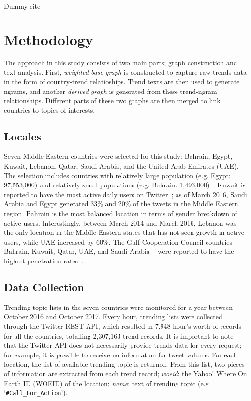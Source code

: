 \documentclass[conference]{IEEEtran}
\begin{document}
Dummy cite~\cite{oatley+crick:snam2015,albishry-et-al:iccci2017,albishry-et-al:ssei2018}

\section{Methodology}\label{method}

The approach in this study consists of two main parts; graph construction
and text analysis. First, {\emph{weighted base graph}} is constructed to 
capture raw trends data in the form of country-trend relatioships. Trend 
texts are then used to generate ngrams, and another {\emph{derived graph}}
is generated from these trend-ngram relationships. Different parts of these 
two graphs are then merged to link countries to topics of interests.

\subsection{Locales}

Seven Middle Eastern countries were selected for this study: Bahrain,
Egypt, Kuwait, Lebanon, Qatar, Saudi Arabia, and the United Arab
Emirates (UAE). The selection includes countries with relatively large
population (e.g. Egypt: 97,553,000) and relatively small populations
(e.g. Bahrain:
1,493,000)~\cite{UnitedNationsDepartmentofEconomicandSocialAffairs2017}.
Kuwait is reported to have the most active daily users on
Twitter~\cite{Salem2017}; as of March 2016, Saudi Arabia and Egypt
generated 33\% and 20\% of the tweets in the Middle Eastern
region. Bahrain is the most balanced location in terms of gender
breakdown of active users. Interestingly, between March 2014 and March
2016, Lebanon was the only location in the Middle Eastern states that
has not seen growth in active users, while UAE increased by 60\%. The
Gulf Cooperation Council countries -- Bahrain, Kuwait, Qatar, UAE, and
Saudi Arabia -- were reported to have the highest penetration
rates~\cite{Salem2017}.

\subsection{Data Collection}

Trending topic lists in the seven countries were monitored for a year
between October 2016 and October 2017. Every hour, trending lists were
collected through the Twitter REST API, which resulted in 7,948 hour's
worth of records for all the countries, totalling 2,307,163 trend
records. It is important to note that the Twitter API does not
necessarily provide trends data for every request; for example, it is
possible to receive no information for tweet volume. For each
location, the list of available trending topic is returned. From this
list, two pieces of information are extracted from each trend record;
{\emph{woeid}}: the Yahoo! Where On Earth ID (WOEID) of the location;
{\emph{name}}: text of trending topic (e.g `{\texttt{\#Call\_For\_Action}}').
\end{document}
